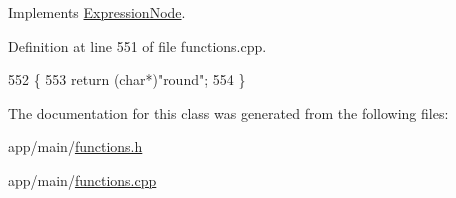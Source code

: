 Implements \hyperlink{classExpressionNode_a42a5e9562b0f645a19dcc83f698069b5}{Expression\+Node}.



Definition at line 551 of file functions.\+cpp.


\begin{DoxyCode}
552 \{
553     \textcolor{keywordflow}{return} (\textcolor{keywordtype}{char}*)\textcolor{stringliteral}{"round"};
554 \}
\end{DoxyCode}


The documentation for this class was generated from the following files\+:\begin{DoxyCompactItemize}
\item 
app/main/\hyperlink{functions_8h}{functions.\+h}\item 
app/main/\hyperlink{functions_8cpp}{functions.\+cpp}\end{DoxyCompactItemize}
